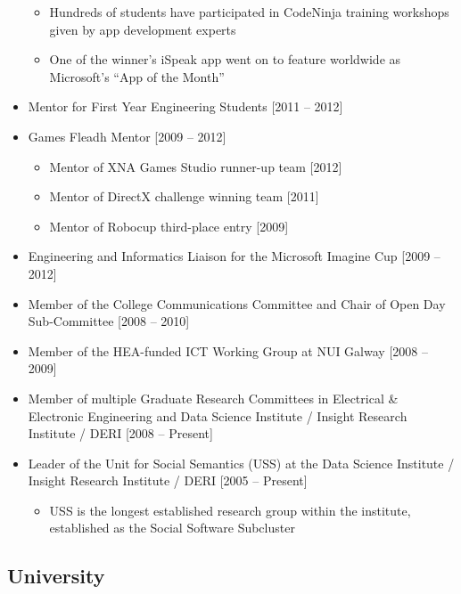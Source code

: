 \documentclass[10pt,a4paper]{res} %
\begin{document}
\begin{resume}
\begin{itemize}
\begin{itemize}
\item Hundreds of students have participated in CodeNinja training workshops given by app development experts
\item One of the winner's iSpeak app went on to feature worldwide as Microsoft's ``App of the Month''
\end{itemize}
\item Mentor for First Year Engineering Students [2011 -- 2012]
\item Games Fleadh Mentor [2009 -- 2012]
\begin{itemize} \itemsep -2pt
\item Mentor of XNA Games Studio runner-up team [2012]
\item Mentor of DirectX challenge winning team [2011] 
\item Mentor of Robocup third-place entry [2009]
\end{itemize}
\item Engineering and Informatics Liaison for the Microsoft Imagine Cup [2009 -- 2012]
\item Member of the College Communications Committee and Chair of Open Day Sub-Committee [2008 -- 2010]
\item Member of the HEA-funded ICT Working Group at NUI Galway [2008 -- 2009]
\item Member of multiple Graduate Research Committees in Electrical \& Electronic Engineering and Data Science Institute / Insight Research Institute / DERI [2008 -- Present]
\item Leader of the Unit for Social Semantics (USS) at the Data Science Institute / Insight Research Institute / DERI [2005 -- Present]
\begin{itemize} \itemsep -2pt
\item USS is the longest established research group within the institute, established as the Social Software Subcluster
\end{itemize}
\end{itemize}

\subsection*{University}


\end{resume}
\end{document}
